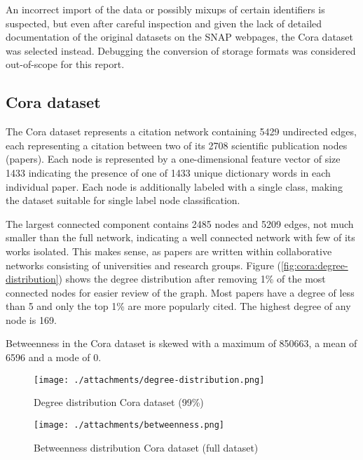 \documentclass[a4paper,10pt]{article}
\begin{document}
An incorrect import of the data or possibly mixups of certain identifiers is suspected, but even after careful inspection and given the lack of detailed documentation of the original datasets on the SNAP webpages, the Cora dataset was selected instead. Debugging the conversion of storage formats was considered out-of-scope for this report.

\subsection{Cora dataset}

The Cora dataset represents a citation network containing 5429 undirected edges, each representing a citation between two of its 2708 scientific publication nodes (papers). Each node is represented by a one-dimensional feature vector of size 1433 indicating the presence of one of 1433 unique dictionary words in each individual paper. Each node is additionally labeled with a single class, making the dataset suitable for single label node classification.

The largest connected component contains 2485 nodes and 5209 edges, not much smaller than the full network, indicating a well connected network with few of its works isolated. This makes sense, as papers are written within collaborative networks consisting of universities and research groups. Figure (\ref{fig:cora:degree-distribution}) shows the degree distribution after removing 1\% of the most connected nodes for easier review of the graph. Most papers have a degree of less than 5 and only the top 1\% are more popularly cited. The highest degree of any node is 169.

Betweenness in the Cora dataset is skewed with a maximum of 850663, a mean of 6596 and a mode of 0.

\begin{figure}[!bp]
  \centering
  \begin{minipage}[b]{0.40\textwidth}
    \texttt{[image: ./attachments/degree-distribution.png]}
    \caption{Degree distribution Cora dataset (99\%)}
    \label{fig:cora:degree-distribution}
  \end{minipage}
  \hfill
  \begin{minipage}[b]{0.40\textwidth}
    \texttt{[image: ./attachments/betweenness.png]}
    \caption{Betweenness distribution Cora dataset (full dataset)}
    \label{fig:cora:betweenness-distribution}
  \end{minipage}
\end{figure}
\end{document}
